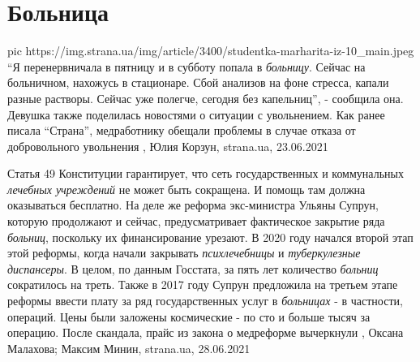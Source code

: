  
 
 
 
 
\chapter{Больница}
\label{sec:slova.bolnica}

\ifcmt
  pic https://img.strana.ua/img/article/3400/studentka-marharita-iz-10_main.jpeg
\fi
\enquote{Я перенервничала в пятницу и в субботу попала в \emph{больницу}. Сейчас на
больничном, нахожусь в стационаре. Сбой анализов на фоне стресса, капали разные
растворы. Сейчас уже полегче, сегодня без капельниц}, - сообщила она.  Девушка
также поделилась новостями о ситуации с увольнением. Как ранее писала \enquote{Страна},
медработнику обещали проблемы в случае отказа от добровольного увольнения
, Юлия Корзун, strana.ua, 23.06.2021

Статья 49 Конституции гарантирует, что сеть государственных и коммунальных
\emph{лечебных учреждений} не может быть сокращена. И помощь там должна оказываться
бесплатно.  На деле же реформа экс-министра Ульяны Супрун, которую продолжают и
сейчас, предусматривает фактическое закрытие ряда \emph{больниц}, поскольку их
финансирование урезают. В 2020 году начался второй этап этой реформы, когда
начали закрывать \emph{психлечебницы} и \emph{туберкулезные диспансеры}.  В целом, по данным
Госстата, за пять лет количество \emph{больниц} сократилось на треть.  Также в 2017
году Супрун предложила на третьем этапе реформы ввести плату за ряд
государственных услуг в \emph{больницах} - в частности, операций. Цены были заложены
космические - по сто и больше тысяч за операцию. После скандала, прайс из
закона о медреформе вычеркнули
, 
Оксана Малахова; Максим Минин, strana.ua, 28.06.2021


